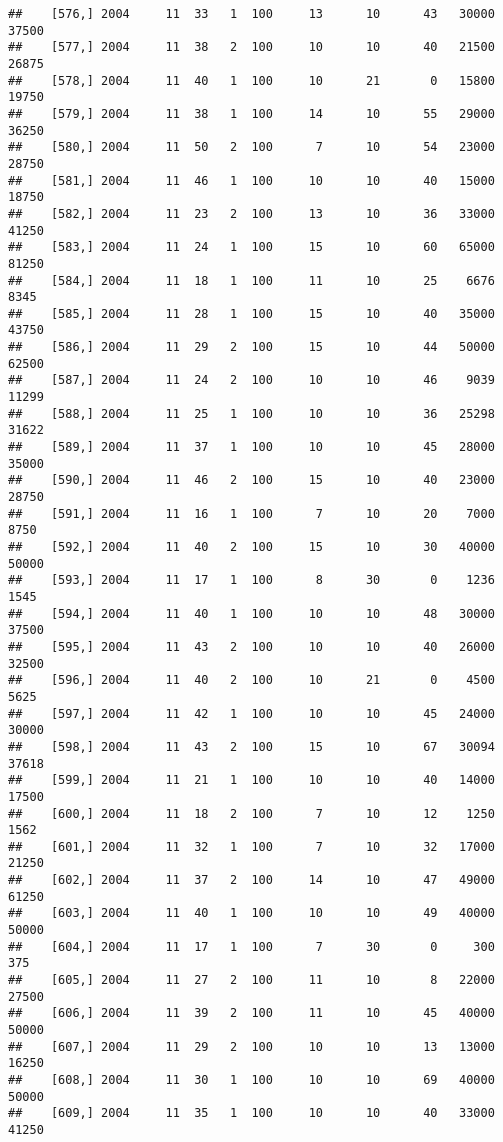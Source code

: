 \documentclass{article}\usepackage[]{graphicx}\usepackage[]{color}
\makeatletter
\newenvironment{kframe}{%
 \def\at@end@of@kframe{}%
 \ifinner\ifhmode%
  \def\at@end@of@kframe{\end{minipage}}%
  \begin{minipage}{\columnwidth}%
 \fi\fi%
 \def\FrameCommand##1{\hskip\@totalleftmargin \hskip-\fboxsep
 \colorbox{shadecolor}{##1}\hskip-\fboxsep
     \hskip-\linewidth \hskip-\@totalleftmargin \hskip\columnwidth}%
 \MakeFramed {\advance\hsize-\width
   \@totalleftmargin\z@ \linewidth\hsize
   \@setminipage}}%
 {\par\unskip\endMakeFramed%
 \at@end@of@kframe}
\newenvironment{knitrout}{}{} %
\makeatother
\begin{document}
\begin{knitrout}
\begin{kframe}
\begin{verbatim}
##    [576,] 2004     11  33   1  100     13      10      43   30000   37500
##    [577,] 2004     11  38   2  100     10      10      40   21500   26875
##    [578,] 2004     11  40   1  100     10      21       0   15800   19750
##    [579,] 2004     11  38   1  100     14      10      55   29000   36250
##    [580,] 2004     11  50   2  100      7      10      54   23000   28750
##    [581,] 2004     11  46   1  100     10      10      40   15000   18750
##    [582,] 2004     11  23   2  100     13      10      36   33000   41250
##    [583,] 2004     11  24   1  100     15      10      60   65000   81250
##    [584,] 2004     11  18   1  100     11      10      25    6676    8345
##    [585,] 2004     11  28   1  100     15      10      40   35000   43750
##    [586,] 2004     11  29   2  100     15      10      44   50000   62500
##    [587,] 2004     11  24   2  100     10      10      46    9039   11299
##    [588,] 2004     11  25   1  100     10      10      36   25298   31622
##    [589,] 2004     11  37   1  100     10      10      45   28000   35000
##    [590,] 2004     11  46   2  100     15      10      40   23000   28750
##    [591,] 2004     11  16   1  100      7      10      20    7000    8750
##    [592,] 2004     11  40   2  100     15      10      30   40000   50000
##    [593,] 2004     11  17   1  100      8      30       0    1236    1545
##    [594,] 2004     11  40   1  100     10      10      48   30000   37500
##    [595,] 2004     11  43   2  100     10      10      40   26000   32500
##    [596,] 2004     11  40   2  100     10      21       0    4500    5625
##    [597,] 2004     11  42   1  100     10      10      45   24000   30000
##    [598,] 2004     11  43   2  100     15      10      67   30094   37618
##    [599,] 2004     11  21   1  100     10      10      40   14000   17500
##    [600,] 2004     11  18   2  100      7      10      12    1250    1562
##    [601,] 2004     11  32   1  100      7      10      32   17000   21250
##    [602,] 2004     11  37   2  100     14      10      47   49000   61250
##    [603,] 2004     11  40   1  100     10      10      49   40000   50000
##    [604,] 2004     11  17   1  100      7      30       0     300     375
##    [605,] 2004     11  27   2  100     11      10       8   22000   27500
##    [606,] 2004     11  39   2  100     11      10      45   40000   50000
##    [607,] 2004     11  29   2  100     10      10      13   13000   16250
##    [608,] 2004     11  30   1  100     10      10      69   40000   50000
##    [609,] 2004     11  35   1  100     10      10      40   33000   41250

\end{verbatim}
\end{kframe}
\end{knitrout}
\end{document}
